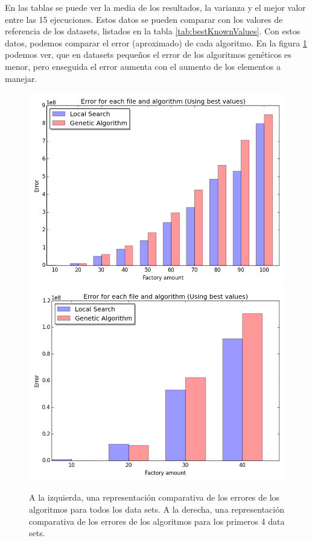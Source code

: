 \documentclass[10pt,a4paper]{article}
\begin{document}
En las tablas se puede ver la media de los resultados, la varianza y el mejor valor entre las 15 ejecuciones. Estos datos se pueden comparar con los valores de referencia de los datasets, listados en la tabla \ref{tab:bestKnownValues}. Con estos datos, podemos comparar el error (aproximado) de cada algoritmo. En la figura \ref{fig:errorComparison} podemos ver, que en datasets pequeños el error de los algoritmos genéticos es menor, pero enseguida el error aumenta con el aumento de los elementos a manejar.

\begin{figure}[!htb]
  \includegraphics[width=\linewidth]{errorWithBest.png}
\endminipage\hfill
{}
  \includegraphics[width=\linewidth]{errorWithBestSmall.png}
\endminipage
\caption{A la izquierda, una representación comparativa de los errores de los algoritmos para todos los data sets. A la derecha, una representación comparativa de los errores de los algoritmos para los primeros 4 data sets.}
\label{fig:errorComparison}
\end{figure}
\end{document}

